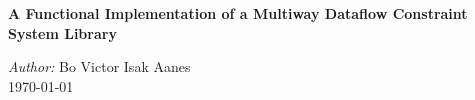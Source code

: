 \begin{titlepage}

\center %
\begin{Huge}
	\bfseries{A Functional Implementation of a Multiway Dataflow Constraint System Library}\\[0.7cm] %
\end{Huge}


\large \emph{Author:} Bo Victor Isak Aanes\\




{\large \monthyeardate\today}\\[3cm] %


\vfill %

\end{titlepage}
